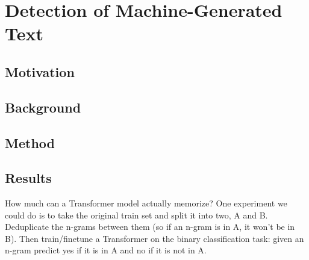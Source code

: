 \chapter{Detection of Machine-Generated Text}
\label{chap:detection}

\section{Motivation}
\section{Background}
\section{Method}
\section{Results}How much can a Transformer model actually memorize? One experiment we could do is to take the original train set and split it into two, A and B. Deduplicate the n-grams between them (so if an n-gram is in A, it won't be in B). Then train/finetune a Transformer on the binary classification task: given an n-gram predict yes if it is in A and no if it is not in A.